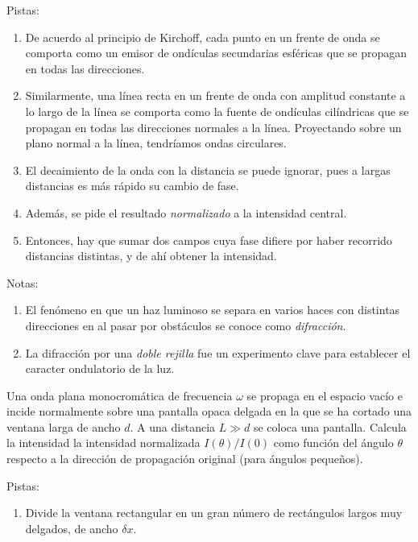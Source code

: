 \documentclass{exam}
\newenvironment{pistas}{\par\noindent Pistas:\begin{enumerate}} {\end{enumerate}}
\newenvironment{notas}{\par\noindent Notas:\begin{enumerate}} {\end{enumerate}}
\begin{document}
\begin{questions}
  \begin{pistas}
  \item De acuerdo al principio de Kirchoff, cada punto en un frente
    de onda se comporta como un emisor de ondículas secundarias esféricas que se
    propagan en todas las direcciones.
  \item Similarmente, una línea recta en un frente de onda con
    amplitud constante a lo largo de la línea se comporta como la
    fuente de ondículas cilíndricas que se propagan en todas las
    direcciones normales a la línea. Proyectando sobre un plano normal
    a la línea, tendríamos ondas circulares.
  \item El decaimiento de la onda con la distancia se puede ignorar,
    pues a largas distancias es más rápido su cambio de fase.
  \item Además, se pide el resultado {\em normalizado} a la intensidad
    central.
  \item Entonces, hay que sumar dos campos cuya fase difiere por haber
    recorrido distancias distintas, y de ahí obtener la intensidad.
  \end{pistas}
  \begin{notas}
  \item El fenómeno en que un haz luminoso se separa en varios haces
    con distintas direcciones en al pasar por obstáculos se conoce
    como {\em difracción}.
  \item La difracción por una {\em doble rejilla} fue un experimento
    clave para establecer el caracter ondulatorio de la luz.
  \end{notas}
\question\label{l} Una onda plana monocromática de frecuencia $\omega$ se
  propaga en el espacio vacío e incide normalmente sobre una pantalla opaca
  delgada en la que se ha cortado una ventana larga de ancho $d$. A
  una distancia $L\gg d$ se coloca una
  pantalla. Calcula la intensidad la intensidad normalizada
  $I(\theta)/I(0)$ como función del ángulo $\theta$ respecto a la
  dirección de propagación original (para ángulos pequeños).
  \begin{pistas}
  \item Divide la ventana rectangular en un gran número de rectángulos
    largos muy delgados, de ancho $\delta x$.

\end{pistas}
\end{questions}
\end{document}
